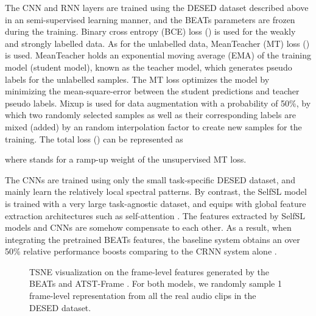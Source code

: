 \documentclass{article}
\begin{document}
The CNN and RNN layers are trained using the DESED dataset described above in an semi-supervised learning manner, and the BEATs parameters are frozen during the training.  Binary cross entropy (BCE) loss () is used for the weakly and strongly labelled data. As for the unlabelled data, MeanTeacher (MT) \cite{tarvainen2017mean} loss () is used. MeanTeacher holds an exponential moving average (EMA) of the training model (student model), known as the teacher model, which generates pseudo labels for the unlabelled samples. The MT loss optimizes the model by minimizing the mean-square-error between the student predictions and teacher pseudo labels. 
Mixup \cite{zhang2017mixup} is used for data augmentation with a probability of 50\%, by which two randomly selected samples as well as their corresponding labels are mixed (added) by an random interpolation factor to create new samples for the training.
The total loss () can be represented as 

where  stands for a ramp-up weight of the unsupervised MT loss.


The CNNs are trained using only the small task-specific DESED dataset, and mainly learn the relatively local spectral patterns. By contrast,
the SelfSL model is trained with a very large task-agnostic dataset, and equips with global feature extraction architectures such as self-attention \cite{vaswani2017attention}. The features extracted by SelfSL models and CNNs are somehow compensate to each other. As a result, when integrating the pretrained BEATs features, the baseline system obtains an over 50\% relative performance boosts comparing to the CRNN system alone \cite{jiakai2018mean}. 

\begin{figure}[t]
\caption{TSNE \cite{Hinton2008tsne} visualization on the frame-level features generated by the BEATs \cite{Chen2023BEATs} and ATST-Frame \cite{li2023self}. 
For both models, we randomly sample 1 frame-level representation from all the real audio clips in the DESED dataset.
}
\label{fig: feat_dist}
\vspace{-1em}
\end{figure}
\end{document}
